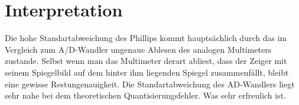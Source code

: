 \section{Interpretation}
\label{chap:VERSUCH_2_INTERPRETATION}
Die hohe Standartabweichung des Phillips kommt hauptsächlich durch das im Vergleich zum A/D-Wandler ungenaue Ablesen des analogen Multimeters zustande. Selbst wenn man das Multimeter derart abliest, dass der Zeiger mit seinem Spiegelbild auf dem hinter ihm liegenden Spiegel zusammenfällt, bleibt eine gewisse Restungenauigkeit. 
Die Standartabweichung des AD-Wandlers liegt sehr nahe bei dem theoretischen Quantisierungsfehler. Was sehr erfreulich ist. 



